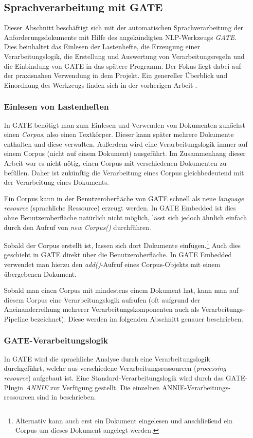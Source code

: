 \documentclass[12pt]{report}
\begin{document}
\subsection{Sprachverarbeitung mit GATE}
Dieser Abschnitt beschäftigt sich mit der automatischen Sprachverarbeitung der Anforderungsdokumente mit Hilfe des angekündigten NLP-Werkzeugs \textit{GATE}. Dies beinhaltet das Einlesen der Lastenhefte, die Erzeugung einer Verarbeitungslogik, die Erstellung und Auswertung von Verarbeitungsregeln und die Einbindung von GATE in das spätere Programm. Der Fokus liegt dabei auf der praxisnahen Verwendung in dem Projekt. Ein genereller Überblick und Einordnung des Werkzeugs finden sich in der vorherigen Arbeit \cite{rs18}.

\subsubsection{Einlesen von Lastenheften}
In GATE benötigt man zum Einlesen und Verwenden von Dokumenten zunächst einen \textit{Corpus}, also einen Textkörper. Dieser kann später mehrere Dokumente enthalten und diese verwalten. Außerdem wird eine Verarbeitungslogik immer auf einem Corpus (nicht auf einem Dokument) ausgeführt. Im Zusammenhang dieser Arbeit war es nicht nötig, einen Corpus mit verschiedenen Dokumenten zu befüllen. Daher ist zukünftig die Verarbeitung eines Corpus gleichbedeutend mit der Verarbeitung eines Dokuments. 

Ein Corpus kann in der Benutzeroberfläche von GATE schnell als neue \textit{language resource} (sprachliche Ressource) erzeugt werden. In GATE Embedded ist dies ohne Benutzeroberfläche natürlich nicht möglich, lässt sich jedoch ähnlich einfach durch den Aufruf von \textit{new Corpus()} durchführen. 

Sobald der Corpus erstellt ist, lassen sich dort Dokumente einfügen.\footnote{Alternativ kann auch erst ein Dokument eingelesen und anschließend ein Corpus um dieses Dokument angelegt werden.} Auch dies geschieht in GATE direkt über die Benutzeroberfläche. In GATE Embedded verwendet man hierzu den \textit{add()}-Aufruf eines Corpus-Objekts mit einem übergebenen Dokument. 

Sobald man einen Corpus mit mindestens einem Dokument hat, kann man auf diesem Corpus eine Verarbeitungslogik aufrufen (oft aufgrund der Aneinanderreihung mehrerer Verarbeitungskomponenten auch als Verarbeitungs-Pipeline bezeichnet). Diese werden im folgenden Abschnitt genauer beschrieben.

\subsubsection{GATE-Verarbeitungslogik}
In GATE wird die sprachliche Analyse durch eine Verarbeitungslogik durchgeführt, welche aus verschiedene Verarbeitungsressourcen (\textit{processing resource}) aufgebaut ist. Eine Standard-Verarbeitungslogik wird durch das GATE-Plugin \textit{ANNIE} zur Verfügung gestellt. Die einzelnen ANNIE-Verarbeitungs- ressourcen sind in \cite{rs18} beschrieben. 
\end{document}
